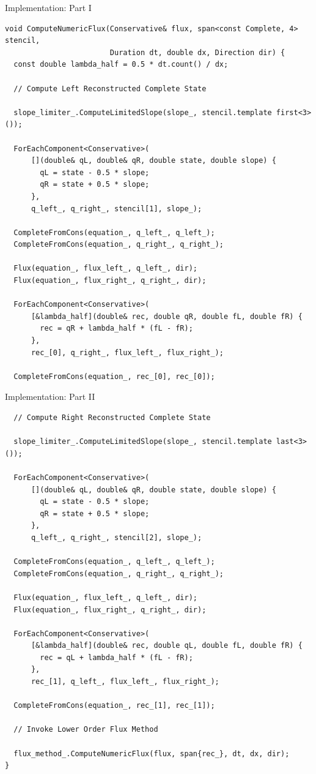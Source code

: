 \documentclass[ucs,9pt]{beamer}
\begin{document}
\begin{frame}[fragile]{Implementation: Part I}
\begin{lstlisting}
void ComputeNumericFlux(Conservative& flux, span<const Complete, 4> stencil,
                        Duration dt, double dx, Direction dir) {
  const double lambda_half = 0.5 * dt.count() / dx;

  // Compute Left Reconstructed Complete State

  slope_limiter_.ComputeLimitedSlope(slope_, stencil.template first<3>());

  ForEachComponent<Conservative>(
      [](double& qL, double& qR, double state, double slope) {
        qL = state - 0.5 * slope;
        qR = state + 0.5 * slope;
      },
      q_left_, q_right_, stencil[1], slope_);

  CompleteFromCons(equation_, q_left_, q_left_);
  CompleteFromCons(equation_, q_right_, q_right_);

  Flux(equation_, flux_left_, q_left_, dir);
  Flux(equation_, flux_right_, q_right_, dir);

  ForEachComponent<Conservative>(
      [&lambda_half](double& rec, double qR, double fL, double fR) {
        rec = qR + lambda_half * (fL - fR);
      },
      rec_[0], q_right_, flux_left_, flux_right_);

  CompleteFromCons(equation_, rec_[0], rec_[0]);
\end{lstlisting}
\end{frame}

\begin{frame}[fragile]{Implementation: Part II}
\begin{lstlisting}
  // Compute Right Reconstructed Complete State

  slope_limiter_.ComputeLimitedSlope(slope_, stencil.template last<3>());

  ForEachComponent<Conservative>(
      [](double& qL, double& qR, double state, double slope) {
        qL = state - 0.5 * slope;
        qR = state + 0.5 * slope;
      },
      q_left_, q_right_, stencil[2], slope_);

  CompleteFromCons(equation_, q_left_, q_left_);
  CompleteFromCons(equation_, q_right_, q_right_);

  Flux(equation_, flux_left_, q_left_, dir);
  Flux(equation_, flux_right_, q_right_, dir);

  ForEachComponent<Conservative>(
      [&lambda_half](double& rec, double qL, double fL, double fR) {
        rec = qL + lambda_half * (fL - fR);
      },
      rec_[1], q_left_, flux_left_, flux_right_);

  CompleteFromCons(equation_, rec_[1], rec_[1]);

  // Invoke Lower Order Flux Method

  flux_method_.ComputeNumericFlux(flux, span{rec_}, dt, dx, dir);
}
\end{lstlisting}
\end{frame}
\end{document}
